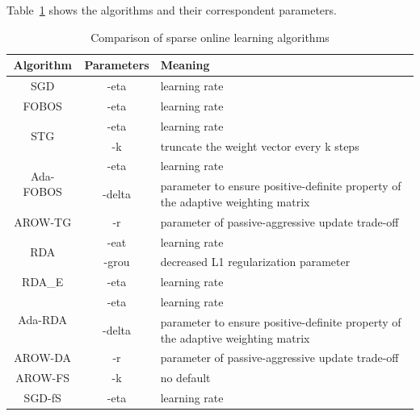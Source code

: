 \documentclass[11pt,a4paper]{article}
\begin{document}
\begin{enumerate}
        Table~\ref{tbl:param_illustrate} shows the algorithms and their
        correspondent parameters.  
        \begin{table}[!ht]
            \renewcommand{\arraystretch}{1.3}
            \caption{Comparison of sparse online learning algorithms}
            \label{tbl:param_illustrate}
            \centering
            \begin{tabular}{|c|c|p{9cm}|}
                \hline
                Algorithm & Parameters & Meaning\\
                \hline
                SGD & -eta & learning rate \\
                \hline
                FOBOS & -eta & learning rate \\
                \hline
                \multirow{2}{*}{STG}& -eta & learning rate \\
                \cline{2-3}
                &-k & truncate the weight vector every k steps \\
                \hline
                \multirow{2}{*}{Ada-FOBOS}& -eta & learning rate \\
                \cline{2-3}
                & -delta & parameter to ensure positive-definite property of the adaptive weighting matrix \\
                \hline
                AROW-TG& -r &  parameter of passive-aggressive update trade-off\\
                \hline
                \multirow{2}{*}{RDA}&  -eat &  learning rate \\
                \cline{2-3}
                &-grou & decreased L1 regularization parameter \\
                \hline
                RDA\_E&  -eta & learning rate \\
                \hline
                \multirow{2}{*}{Ada-RDA}& -eta & learning rate \\
                \cline{2-3}
                & -delta & parameter to ensure positive-definite property of the adaptive weighting matrix \\
                \hline
                AROW-DA& -r  &parameter of passive-aggressive update trade-off\\
                \hline
                AROW-FS & -k & no default\\
                \hline
                \multirow{2}{*}{SGD-fS}& -eta & learning rate\\

\end{tabular}
\end{table}
\end{enumerate}
\end{document}
